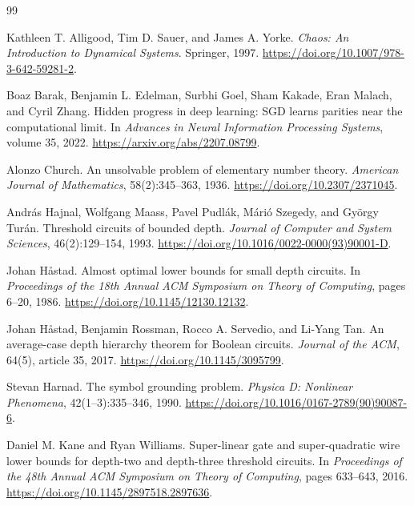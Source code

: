 \documentclass[11pt,twoside]{article}
\theoremstyle{definition}
\theoremstyle{remark}
\begin{document}
\begin{thebibliography}{99}
\raggedright
\small

Kathleen T. Alligood, Tim D. Sauer, and James A. Yorke.
\newblock \emph{Chaos: An Introduction to Dynamical Systems}.
\newblock Springer, 1997.
\newblock \url{https://doi.org/10.1007/978-3-642-59281-2}.

Boaz Barak, Benjamin L. Edelman, Surbhi Goel, Sham Kakade, Eran Malach,
and Cyril Zhang.
\newblock Hidden progress in deep learning: SGD learns parities near the
computational limit.
\newblock In \emph{Advances in Neural Information Processing Systems},
volume 35, 2022.
\newblock \url{https://arxiv.org/abs/2207.08799}.

Alonzo Church.
\newblock An unsolvable problem of elementary number theory.
\newblock \emph{American Journal of Mathematics}, 58(2):345--363, 1936.
\newblock \url{https://doi.org/10.2307/2371045}.

Andr\'as Hajnal, Wolfgang Maass, Pavel Pudl\'ak, M\'ari\'o Szegedy, and
Gy\"orgy Tur\'an.
\newblock Threshold circuits of bounded depth.
\newblock \emph{Journal of Computer and System Sciences}, 46(2):129--154,
1993.
\newblock \url{https://doi.org/10.1016/0022-0000(93)90001-D}.

Johan H\r{a}stad.
\newblock Almost optimal lower bounds for small depth circuits.
\newblock In \emph{Proceedings of the 18th Annual ACM Symposium on Theory of
Computing}, pages 6--20, 1986.
\newblock \url{https://doi.org/10.1145/12130.12132}.

Johan H\r{a}stad, Benjamin Rossman, Rocco A. Servedio, and Li-Yang Tan.
\newblock An average-case depth hierarchy theorem for Boolean circuits.
\newblock \emph{Journal of the ACM}, 64(5), article 35, 2017.
\newblock \url{https://doi.org/10.1145/3095799}.

Stevan Harnad.
\newblock The symbol grounding problem.
\newblock \emph{Physica D: Nonlinear Phenomena}, 42(1--3):335--346, 1990.
\newblock \url{https://doi.org/10.1016/0167-2789(90)90087-6}.

Daniel M. Kane and Ryan Williams.
\newblock Super-linear gate and super-quadratic wire lower bounds for
depth-two and depth-three threshold circuits.
\newblock In \emph{Proceedings of the 48th Annual ACM Symposium on Theory of
Computing}, pages 633--643, 2016.
\newblock \url{https://doi.org/10.1145/2897518.2897636}.


\end{thebibliography}
\end{document}
